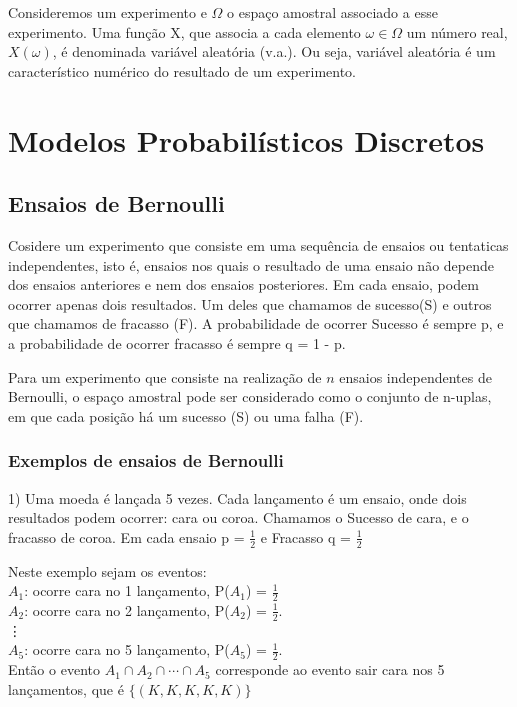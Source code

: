 \documentclass[10pt,a4paper]{article}
\begin{document}
Consideremos um experimento e $ \Omega $ o espaço amostral associado a esse experimento. Uma função X, que associa a cada elemento $ \omega \in \Omega $ um número real, $ X(\omega) $, é denominada variável aleatória (v.a.). Ou seja, variável aleatória é um característico numérico do resultado de um experimento.

\section{Modelos Probabilísticos Discretos}
\subsection{Ensaios de Bernoulli}

Cosidere um experimento que consiste em uma sequência de ensaios ou tentaticas independentes, isto é, ensaios nos quais o resultado de uma ensaio não depende dos ensaios anteriores e nem dos ensaios posteriores. Em cada ensaio, podem ocorrer apenas dois resultados. Um deles que chamamos de sucesso(S) e outros que chamamos de fracasso (F). A probabilidade de ocorrer Sucesso é sempre p, e a probabilidade de ocorrer fracasso é sempre q = 1 - p.


Para um experimento que consiste na realização de $ n $ ensaios independentes de Bernoulli, o espaço amostral pode ser considerado como o conjunto de n-uplas, em que cada posição há um sucesso (S) ou uma falha (F).
\subsubsection{Exemplos de ensaios de Bernoulli}


1) Uma moeda é lançada 5 vezes. Cada lançamento é um ensaio, onde dois resultados podem ocorrer: cara ou coroa. Chamamos o Sucesso de cara, e o fracasso de coroa. Em cada ensaio p = $\frac{1}{2}$ e Fracasso q = $\frac{1}{2}$


Neste exemplo sejam os eventos:\\
$A_{1}$: ocorre cara no 1 lançamento, P($A_{1}$) = $\frac{1}{2}$\\
$A_{2}$: ocorre cara no 2 lançamento, P($A_{2}$) = $\frac{1}{2}$.\\
\vdots\\
$A_{5}$: ocorre cara no 5 lançamento, P($A_{5}$) = $\frac{1}{2}$.\\


Então o evento $A_{1} \cap A_{2} \cap \cdots \cap A_{5}$ corresponde ao evento sair cara nos 5 lançamentos, que é $\lbrace(K, K, K, K, K) \rbrace$
\end{document}
